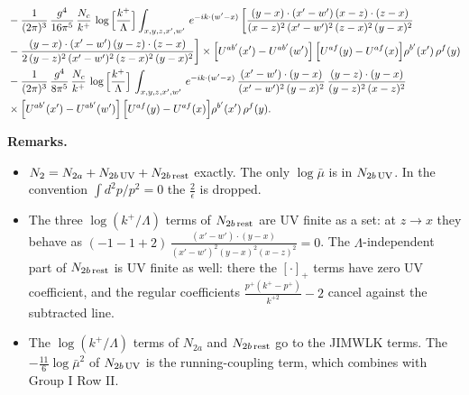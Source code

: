 \documentclass[9pt]{article}
\numberwithin{equation}{section}
\begin{document}
\begin{align}
&-\frac{1}{(2\pi)^{3}}\,\frac{g^{4}}{16\pi^{5}}\,\frac{N_{c}}{k^{+}}\,\log\Big[\frac{k^{+}}{\Lambda}\Big]\int_{x,y,z,x',w'}\,e^{-ik\cdot(w'-x)}\,\bigg[\frac{(y-x)\cdot (x'-w')\,(x-z)\cdot (z-x)}{(x-z)^{2}\,(x'-w')^{2}\,(z-x)^{2}\,(y-x)^{2}}\notag \\ & -\frac{(y-x)\cdot (x'-w')\,(y-z)\cdot (z-x)}{2\,(y-z)^{2}\,(x'-w')^{2}\,(z-x)^{2}\,(y-x)^{2}}\bigg]\times\Big[U^{ab'}(x')-U^{ab'}(w')\Big]\,\Big[U^{af}(y)-U^{af}(x)\Big]\rho^{b'}(x')\,\rho^{f}(y)\notag\\
&-\frac{1}{(2\pi)^{3}}\,\frac{g^{4}}{8\pi^{5}}\,\frac{N_{c}}{k^{+}}\,\log\Big[\frac{k^{+}}{\Lambda}\Big]\,\int_{x,y,z,x',w'}\,e^{-ik\cdot(w'-x)}\,\frac{(x'-w')\cdot(y-x)}{(x'-w')^{2}\,(y-x)^{2}}\,\frac{(y-z)\cdot(y-x)}{(y-z)^{2}\,(x-z)^{2}}\notag\\
&\times\Big[U^{ab'}(x')-U^{ab'}(w')\Big]\,\Big[U^{af}(y)-U^{af}(x)\Big]\rho^{b'}(x')\,\rho^{f}(y).
\end{align}
{\color{red}\noindent\textbf{Remarks.}
\begin{itemize}
\item $N_{2}=N_{2a}+N_{2b\,\rm UV}+N_{2b\,\rm rest}$ exactly. The only $\log\bar\mu$ is in $N_{2b\,\rm UV}$. In the convention $\int d^{2}p/p^{2}=0$ the $\frac{2}{\epsilon}$ is dropped.
\item The three $\log(k^{+}/\Lambda)$ terms of $N_{2b\,\rm rest}$ are UV finite as a set: at $z\to x$ they behave as $(-1-1+2)\,\frac{(x'-w')\cdot(y-x)}{(x'-w')^{2}(y-x)^{2}(x-z)^{2}}=0$. The $\Lambda$-independent part of $N_{2b\,\rm rest}$ is UV finite as well: there the $[\cdot]_{+}$ terms have zero UV coefficient, and the regular coefficients $\frac{p^{+}(k^{+}-p^{+})}{k^{+2}}-2$ cancel against the subtracted line.
\item The $\log(k^{+}/\Lambda)$ terms of $N_{2a}$ and $N_{2b\,\rm rest}$ go to the JIMWLK terms. The $-\frac{11}{6}\log\bar\mu^{2}$ of $N_{2b\,\rm UV}$ is the running-coupling term, which combines with Group I Row II.
\end{itemize}}
\end{document}
